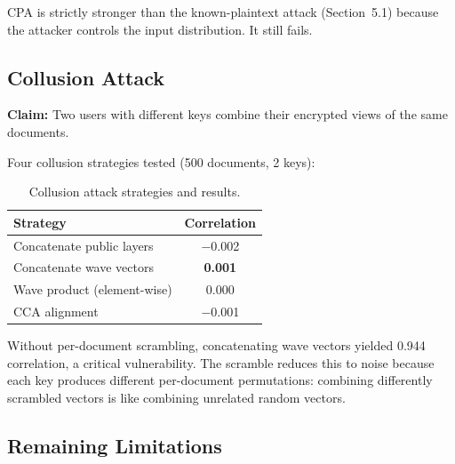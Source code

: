\documentclass{article}
\begin{document}
CPA is strictly stronger than the known-plaintext attack (Section~5.1) because the attacker controls the input distribution.
It still fails.

\subsection{Collusion Attack}

\textbf{Claim:} Two users with different keys combine their encrypted views of the same documents.

Four collusion strategies tested (500 documents, 2 keys):

\begin{table}[htbp]
\centering
\caption{Collusion attack strategies and results.}
\label{tab:collusion}
\begin{tabular}{@{}lc@{}}
\toprule
\textbf{Strategy} & \textbf{Correlation} \\
\midrule
Concatenate public layers & $-$0.002 \\
Concatenate wave vectors & \textbf{0.001} \\
Wave product (element-wise) & 0.000 \\
CCA alignment & $-$0.001 \\
\bottomrule
\end{tabular}
\end{table}

Without per-document scrambling, concatenating wave vectors yielded 0.944 correlation, a critical vulnerability.
The scramble reduces this to noise because each key produces different per-document permutations: combining differently scrambled vectors is like combining unrelated random vectors.

\subsection{Remaining Limitations}
\label{sec:limitations}
\end{document}
